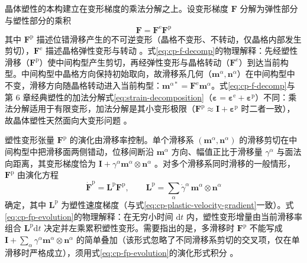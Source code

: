 晶体塑性的本构建立在变形梯度的乘法分解之上。设变形梯度 $\mathbf{F}$ 分解为弹性部分与塑性部分的乘积
\begin{equation}
  \mathbf{F}=\mathbf{F}^{\mathrm{e}}\mathbf{F}^{\mathrm{p}}
  \label{eq:cp-f-decomp}
\end{equation}
其中 $\mathbf{F}^{\mathrm{p}}$ 描述位错滑移产生的不可逆变形（晶格不变形、不转动，仅晶格内部发生剪切），$\mathbf{F}^{\mathrm{e}}$ 描述晶格弹性变形与转动 \cite{Asaro1983,Rice1971}。式\eqref{eq:cp-f-decomp}的物理解释：先经塑性滑移（$\mathbf{F}^{\mathrm{p}}$）使中间构型产生剪切，再经弹性变形与晶格转动（$\mathbf{F}^{\mathrm{e}}$）到达当前构型。中间构型中晶格方向保持初始取向，故滑移系几何（$\mathbf{m}^{\alpha},\mathbf{n}^{\alpha}$）在中间构型中不变，滑移方向随晶格转动进入当前构型：$\mathbf{m}^{\alpha*}=\mathbf{F}^{\mathrm{e}}\mathbf{m}^{\alpha}$。式\eqref{eq:cp-f-decomp}与第 6 章经典塑性的加法分解式\eqref{eq:strain-decomposition}（$\boldsymbol{\varepsilon}=\boldsymbol{\varepsilon}^{\mathrm{e}}+\boldsymbol{\varepsilon}^{\mathrm{p}}$）不同：乘法分解适用于有限变形，加法分解是其小变形极限（$\mathbf{F}^{\mathrm{p}}\approx\mathbf{I}+\boldsymbol{\varepsilon}^{\mathrm{p}}$ 时二者一致），故晶体塑性天然面向大变形问题 \cite{Asaro1983}。

塑性变形张量 $\mathbf{F}^{\mathrm{p}}$ 的演化由滑移率控制。单个滑移系 $(\mathbf{m}^{\alpha},\mathbf{n}^{\alpha})$ 的滑移剪切在中间构型中把滑移面两侧错动，位移间断沿 $\mathbf{m}^{\alpha}$ 方向、幅值正比于滑移量 $\gamma^{\alpha}$ 与面法向距离，其变形梯度恰为 $\mathbf{I}+\gamma^{\alpha}\mathbf{m}^{\alpha}\otimes\mathbf{n}^{\alpha}$ \cite{Asaro1983}。对多个滑移系同时滑移的一般情形，$\mathbf{F}^{\mathrm{p}}$ 由演化方程
\begin{equation}
  \dot{\mathbf{F}}^{\mathrm{p}}=\mathbf{L}^{\mathrm{p}}\mathbf{F}^{\mathrm{p}},\qquad
  \mathbf{L}^{\mathrm{p}}=\sum_{\alpha}\dot{\gamma}^{\alpha}\,\mathbf{m}^{\alpha}\otimes\mathbf{n}^{\alpha}
  \label{eq:cp-fp-evolution}
\end{equation}
确定，其中 $\mathbf{L}^{\mathrm{p}}$ 为塑性速度梯度（与式\eqref{eq:cp-plastic-velocity-gradient}一致）。式\eqref{eq:cp-fp-evolution}的物理解释：在无穷小时间 $\mathrm{d}t$ 内，塑性变形增量由当前滑移率组合 $\mathbf{L}^{\mathrm{p}}\mathrm{d}t$ 决定并左乘累积塑性变形。需要指出的是，多滑移时 $\mathbf{F}^{\mathrm{p}}$ 不能写成 $\mathbf{I}+\sum_{\alpha}\gamma^{\alpha}\mathbf{m}^{\alpha}\otimes\mathbf{n}^{\alpha}$ 的简单叠加（该形式忽略了不同滑移系剪切的交叉项，仅在单滑移时严格成立），须用式\eqref{eq:cp-fp-evolution}的演化形式积分 \cite{Asaro1983}。

